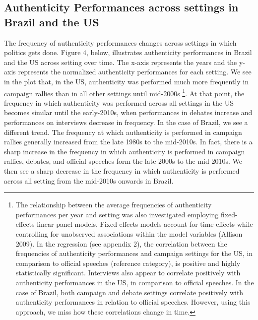 \documentclass[smallextended]{svjour3}       %
\begin{document}
\hypertarget{authenticity-performances-across-settings-in-brazil-and-the-us}{%
\subsection{Authenticity Performances across settings in Brazil and the
US}\label{authenticity-performances-across-settings-in-brazil-and-the-us}}

The frequency of authenticity performances changes across settings in
which politics gets done. Figure 4, below, illustrates authenticity
performances in Brazil and the US across setting over time. The x-axis
represents the years and the y-axis represents the normalized
authenticity performances for each setting. We see in the plot that, in
the US, authenticity was performed much more frequently in campaign
rallies than in all other settings until mid-2000s \footnote{ The
  relationship between the average frequencies of authenticity
  performances per year and setting was also investigated employing
  fixed-effects linear panel models. Fixed-effects models account for
  time effects while controlling for unobserved associations within the
  model variables (Allison 2009). In the regression (see appendix 2),
  the correlation between the frequencies of authenticity performances
  and campaign settings for the US, in comparison to official speeches
  (reference category), is positive and highly statistically
  significant. Interviews also appear to correlate positively with
  authenticity performances in the US, in comparison to official
  speeches. In the case of Brazil, both campaign and debate settings
  correlate positively with authenticity performances in relation to
  official speeches. However, using this approach, we miss how these
  correlations change in time.}. At that point, the frequency in which
authenticity was performed across all settings in the US becomes similar
until the early-2010s, when performances in debates increase and
performances on interviews decrease in frequency. In the case of Brazil,
we see a different trend. The frequency at which authenticity is
performed in campaign rallies generally increased from the late 1980s to
the mid-2010s. In fact, there is a sharp increase in the frequency in
which authenticity is performed in campaign rallies, debates, and
official speeches form the late 2000s to the mid-2010s. We then see a
sharp decrease in the frequency in which authenticity is performed
across all setting from the mid-2010s onwards in Brazil.
\end{document}
